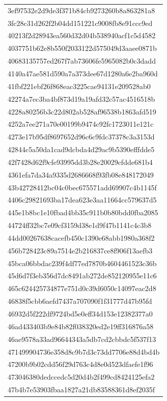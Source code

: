 \begin{tabular}{l}
3ef97532e2d9de3f371b84cb9273260b8a863281a8 \\
3fc28c31d262f2b04dd151221c9008fb8e91ccc9ed \\
40213f2d28943ea560d32d04b538940acf1c5d4582 \\
4037751b62e8b550f2033122d575049d3aaee0871b \\
40683135757ed267f7ab73606fe5965082b0c3dadd \\
4140a47ae581d590a7a373dee67d1280a6e2ba960d \\
41fbf221ebf26f868eac3225cae94131e209528ab0 \\
42274a7ec3ba4bf873d19a19afd32c57ac4516518b \\
4228a80256b3c22d802ab528af96538b1863afd519 \\
4252a7ee271a70e00199b9474c92fc1723011e121c \\
4273e17b95df8697652d96c6c9fdc37378c3a3153d \\
42844c5a50da1cad9dcbda4d29ac9b5390efffdde5 \\
42f7428d62f9cfe93995dd3b28e20029cfdde681b4 \\
4361efa7da34a9335d2686668f93fb08e848172049 \\
43b42728412bc04c0bec675571add69907c4b1145f \\
4406c29821693ba17dea623e3aa11664cc579637d5 \\
445e1b8bc1e10fbad4bb35c911b0b80bdd0fba2085 \\
44724ff32bc7e09cf3159d38e1d9f47b1141c4c3b8 \\
44dd00267638cacefb450c1390e68abb1980a368f2 \\
456b728423c89a7514e2b216837ce8f906f13aefb3 \\
45bca06bbdac239f4df77ed7870b4604461523c36b \\
45d6d7f3eb356d7dc8491ab272de852120955e11c6 \\
465c624425734877e751d0c39d6050c14097eac2d8 \\
46838f5cbb6aefd7437a707090f1f31777d47b95fd \\
46932d5f222df9724bd5e0eff34d153e12382377a0 \\
46ad433403b9e84b82f038320ed2e19ff316876a58 \\
46ae9578a33ad96644343a5db7cd2cbbdc5f537f13 \\
471499904736e358d8c9b7d3c73dd7706e88d4bd4b \\
47200b9b02cdd56f29d763c4d8e0d523dfaefe1f96 \\
473046380dedccedc5d20d4b2f499cd8424125efa2 \\
47b4b7e53903fbaa1827a21db83588361d8ef2035f \\

\end{tabular}
